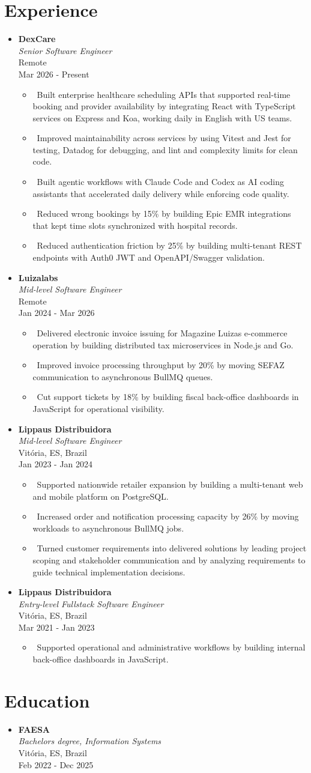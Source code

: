 \documentclass[letterpaper,10pt]{article}
\newcommand{\resumeItem}[1]{\item\small{#1}}
\newcommand{\resumeSubheading}[4]{
\item
  \textbf{#1} \\[-2pt]
  \textit{#3} \\[-2pt]
  #4 \\[-2pt]
  #2\vspace{2pt}
}
\newcommand{\resumeSubHeadingList}{\begin{itemize}[leftmargin=0.15in, label={}, nosep]}
\newcommand{\resumeSubHeadingListEnd}{\end{itemize}}
\newcommand{\resumeRoleGap}{\vspace{2pt}}
\begin{document}
\section{Experience}
\resumeSubHeadingList
  \resumeSubheading
      {DexCare}{Mar 2026 - Present}
      {Senior Software Engineer}{Remote}
      \resumeSubHeadingList
          \resumeItem{\textbullet\ Built enterprise healthcare scheduling APIs that supported real-time booking and provider availability by integrating React with TypeScript services on Express and Koa, working daily in English with US teams.}
          \resumeItem{\textbullet\ Improved maintainability across services by using Vitest and Jest for testing, Datadog for debugging, and lint and complexity limits for clean code.}
          \resumeItem{\textbullet\ Built agentic workflows with Claude Code and Codex as AI coding assistants that accelerated daily delivery while enforcing code quality.}
          \resumeItem{\textbullet\ Reduced wrong bookings by 15\% by building Epic EMR integrations that kept time slots synchronized with hospital records.}
          \resumeItem{\textbullet\ Reduced authentication friction by 25\% by building multi-tenant REST endpoints with Auth0 JWT and OpenAPI/Swagger validation.}
      \resumeSubHeadingListEnd
  \resumeRoleGap
  \resumeSubheading
      {Luizalabs}{Jan 2024 - Mar 2026}
      {Mid-level Software Engineer}{Remote}
      \resumeSubHeadingList
          \resumeItem{\textbullet\ Delivered electronic invoice issuing for Magazine Luiza\textquotesingle{}s e-commerce operation by building distributed tax microservices in Node.js and Go.}
          \resumeItem{\textbullet\ Improved invoice processing throughput by 20\% by moving SEFAZ communication to asynchronous BullMQ queues.}
          \resumeItem{\textbullet\ Cut support tickets by 18\% by building fiscal back-office dashboards in JavaScript for operational visibility.}
      \resumeSubHeadingListEnd
  \resumeRoleGap
  \resumeSubheading
      {Lippaus Distribuidora}{Jan 2023 - Jan 2024}
      {Mid-level Software Engineer}{Vit\'oria, ES, Brazil}
      \resumeSubHeadingList
          \resumeItem{\textbullet\ Supported nationwide retailer expansion by building a multi-tenant web and mobile platform on PostgreSQL.}
          \resumeItem{\textbullet\ Increased order and notification processing capacity by 26\% by moving workloads to asynchronous BullMQ jobs.}
          \resumeItem{\textbullet\ Turned customer requirements into delivered solutions by leading project scoping and stakeholder communication and by analyzing requirements to guide technical implementation decisions.}
      \resumeSubHeadingListEnd
  \resumeRoleGap
  \resumeSubheading
      {Lippaus Distribuidora}{Mar 2021 - Jan 2023}
      {Entry-level Fullstack Software Engineer}{Vit\'oria, ES, Brazil}
      \resumeSubHeadingList
          \resumeItem{\textbullet\ Supported operational and administrative workflows by building internal back-office dashboards in JavaScript.}
      \resumeSubHeadingListEnd
\resumeSubHeadingListEnd

\resumeRoleGap
\section{Education}
\resumeSubHeadingList
  \resumeSubheading
      {FAESA}{Feb 2022 - Dec 2025}
      {Bachelor\textquotesingle{}s degree, Information Systems}{Vit\'oria, ES, Brazil}
\resumeSubHeadingListEnd
\end{document}
